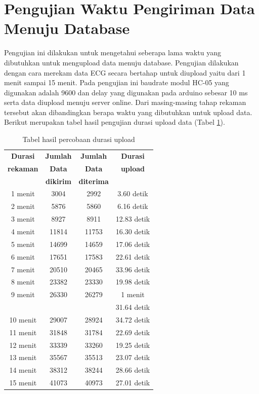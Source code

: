 \section{Pengujian Waktu Pengiriman Data Menuju Database}
\vspace{1ex}
Pengujian ini dilakukan untuk mengetahui seberapa lama waktu yang dibutuhkan untuk mengupload data menuju database. Pengujian dilakukan dengan cara merekam data ECG secara bertahap untuk diupload yaitu dari 1 menit sampai 15 menit. Pada pengujian ini baudrate modul HC-05 yang digunakan adalah 9600 dan delay yang digunakan pada arduino sebesar 10 ms serta data diupload menuju server online. Dari masing-masing tahap rekaman tersebut akan dibandingkan berapa waktu yang dibutuhkan untuk upload data. Berikut merupakan tabel hasil pengujian durasi upload data (Tabel \ref{tabel:4.2}).
\begin{table}[H]
	\caption{Tabel hasil percobaan durasi upload}
	\begin{tabular}{|c|c|c|c|}
		\hline
		\multicolumn{1}{|c|}{{\color[HTML]{000000} \textbf{Durasi}}} & \multicolumn{1}{|c|}{\textbf{Jumlah}} &
		\multicolumn{1}{|c|}{ \textbf{Jumlah}} &
		\multicolumn{1}{|c|}{\textbf{Durasi}}  \\
		\textbf{rekaman} & \textbf{Data} & \textbf{Data} & \textbf{upload} \\
		& \textbf{dikirim} & \textbf{diterima} &    \\ \hline
		1 menit& 3004 & 2992 & 3.60 detik  \\ \hline 
		2 menit& 5876 & 5860 & 6.16 detik   \\ \hline
		3 menit& 8927 & 8911 & 12.83 detik   \\ \hline
		4 menit& 11814 & 11753 & 16.30 detik   \\ \hline
		5 menit& 14699 & 14659 & 17.06 detik   \\ \hline
		6 menit& 17651 & 17583 & 22.61 detik  \\ \hline
		7 menit& 20510 & 20465 & 33.96 detik   \\ \hline
		8 menit& 23382 & 23330 & 19.98 detik   \\ \hline
		9 menit& 26330 & 26279 & 1 menit    \\ 
		& & & 31.64 detik  \\ \hline
		10 menit& 29007 & 28924 & 34.72 detik   \\ \hline
		11 menit & 31848 & 31784 & 22.69 detik   \\ \hline
		12 menit& 33339 & 33260 & 19.25 detik   \\ \hline
		13 menit& 35567 & 35513 & 23.07 detik   \\ \hline
		14 menit& 38312 & 38244 & 28.66 detik   \\ \hline
		15 menit& 41073 & 40973 & 27.01 detik   \\ \hline
	\end{tabular}
	\vspace{1ex}
	
	\label{tabel:4.2}
\end{table}

